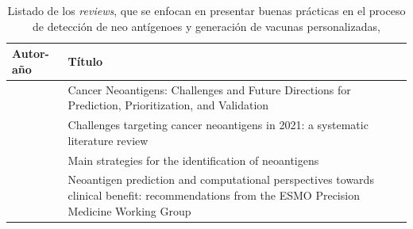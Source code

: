 \begin{table}[H]
	\caption{Listado de los \textit{reviews}, que se enfocan en presentar buenas prácticas en el proceso de detección de neo antígenoes y generación de vacunas personalizadas,}
	\label{tab:review_buen}
	\begin{tabular}{p{3cm}p{10cm}}
		\textbf{Autor-año }                            & \textbf{Título}                                                                                                                                \\ \hline
		\cite{borden2022cancer}       & Cancer Neoantigens: Challenges and Future Directions for Prediction, Prioritization, and Validation                                           \\
		\cite{chen2021challenges}     & Challenges targeting cancer neoantigens in 2021: a systematic literature review                                                             \\	
		\cite{gopanenko2020main}      & Main strategies for the identification of neoantigens                                                                                         \\
		\cite{de2020neoantigen}       & Neoantigen prediction and computational perspectives towards clinical benefit: recommendations from the ESMO Precision Medicine Working Group \\	
		

\end{tabular}
\end{table}

